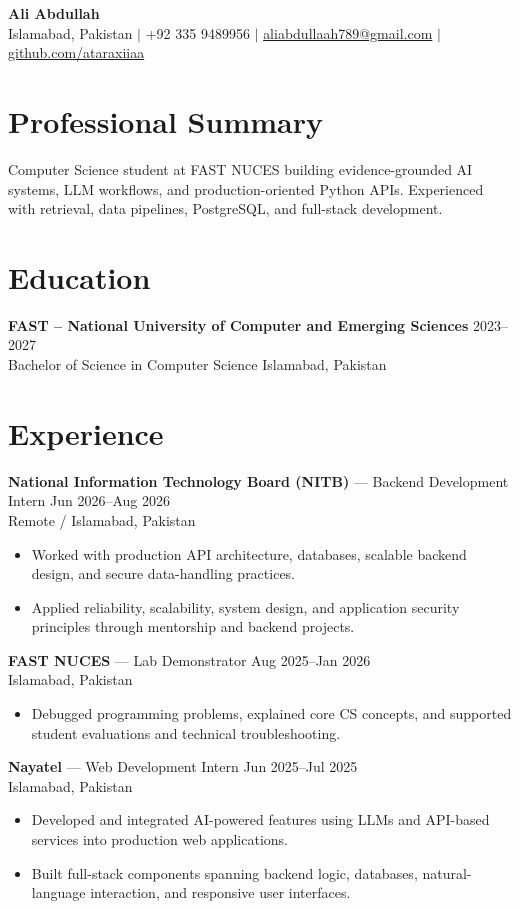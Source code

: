 \documentclass[10pt,a4paper]{article}
\begin{document}
\begin{center}
{\Large\bfseries Ali Abdullah}\\[2pt]
Islamabad, Pakistan $\mid$ +92 335 9489956 $\mid$
\href{mailto:aliabdullaah789@gmail.com}{aliabdullaah789@gmail.com} $\mid$
\href{https://github.com/ataraxiiaa}{github.com/ataraxiiaa}
\end{center}

\section*{Professional Summary}
Computer Science student at FAST NUCES building evidence-grounded AI systems, LLM workflows, and production-oriented Python APIs. Experienced with retrieval, data pipelines, PostgreSQL, and full-stack development.

\section*{Education}
\textbf{FAST -- National University of Computer and Emerging Sciences} \hfill 2023--2027\\
Bachelor of Science in Computer Science \hfill Islamabad, Pakistan

\section*{Experience}
\textbf{National Information Technology Board (NITB)} --- Backend Development Intern \hfill Jun 2026--Aug 2026\\
Remote / Islamabad, Pakistan
\begin{itemize}
\item Worked with production API architecture, databases, scalable backend design, and secure data-handling practices.
\item Applied reliability, scalability, system design, and application security principles through mentorship and backend projects.
\end{itemize}

\textbf{FAST NUCES} --- Lab Demonstrator \hfill Aug 2025--Jan 2026\\
Islamabad, Pakistan
\begin{itemize}
\item Debugged programming problems, explained core CS concepts, and supported student evaluations and technical troubleshooting.
\end{itemize}

\textbf{Nayatel} --- Web Development Intern \hfill Jun 2025--Jul 2025\\
Islamabad, Pakistan
\begin{itemize}
\item Developed and integrated AI-powered features using LLMs and API-based services into production web applications.
\item Built full-stack components spanning backend logic, databases, natural-language interaction, and responsive user interfaces.
\end{itemize}
\end{document}
